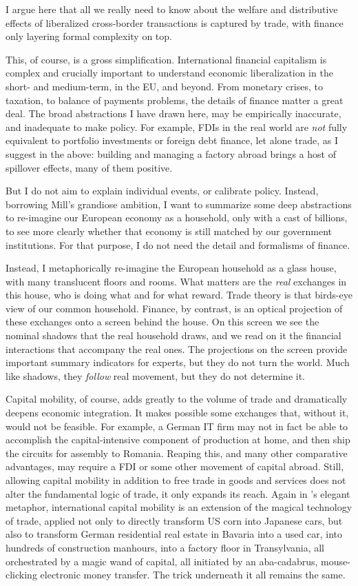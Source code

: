 \documentclass[11pt,a4paper,oneside]{article}
\begin{document}
I argue here that all we really need to know about the welfare and distributive effects of liberalized cross-border transactions is captured by trade, with finance only layering formal complexity on top.

This, of course, is a gross simplification.
International financial capitalism is complex and crucially important to understand economic liberalization in the short- and medium-term, in the \gls{EU}, and beyond.
From monetary crises, to taxation, to balance of payments problems, the details of finance matter a great deal.
The broad abstractions I have drawn here, may be empirically inaccurate, and inadequate to make policy.
For example, \glspl{FDI} in the real world are \emph{not} fully equivalent to portfolio investments or foreign debt finance, let alone trade, as I suggest in the above:
building and managing a factory abroad brings a host of spillover effects, many of them positive.

But I do not aim to explain individual events, or calibrate policy.
Instead, borrowing Mill's grandiose ambition, I want to summarize some deep abstractions to re-imagine our European economy as a household, only with a cast of billions, to see more clearly whether that economy is still matched by our government institutions.
For that purpose, I do not need the detail and formalisms of finance.

Instead, I metaphorically re-imagine the European household as a glass house, with many translucent floors and rooms.
What matters are the \emph{real} exchanges in this house, who is doing what and for what reward.
Trade theory is that birds-eye view of our common household.
Finance, by contrast, is an optical projection of these exchanges onto a screen behind the house.
On this screen we see the nominal shadows that the real household draws, and we read on it the financial interactions that accompany the real ones.
The projections on the screen provide important summary indicators for experts, but they do not turn the world.
Much like shadows, they \emph{follow} real movement, but they do not determine it.

Capital mobility, of course, adds greatly to the volume of trade and dramatically deepens economic integration.
It makes possible some exchanges that, without it, would not be feasible.
For example, a German IT firm may not in fact be able to accomplish the capital-intensive component of production at home, and then ship the circuits for assembly to Romania.
Reaping this, and many other comparative advantages, may require a \gls{FDI} or some other movement of capital abroad.
Still, allowing capital mobility in addition to free trade in goods and services does not alter the fundamental logic of trade, it only expands its reach.
Again in \citeauthor{Mankiw-2004-aa}'s elegant metaphor, international capital mobility is an extension of the magical technology of trade, applied not only to directly transform US corn into Japanese cars, but also to transform German residential real estate in Bavaria into a used car, into hundreds of construction manhours, into a factory floor in Transylvania, all orchestrated by a magic wand of capital, all initiated by an aba-cadabrus, mouse-clicking electronic money transfer.
The trick underneath it all remains the same.
\end{document}
